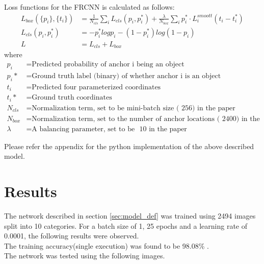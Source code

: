 \documentclass[12pt]{article}
\begin{document}
Loss functions for the FRCNN is calculated as follows:
\begin{align}
	L_{box}(\{p_i\},\{t_i\}) &= \frac{1}{N_{cls}}\sum_{i}{}L_{cls}(p_i, p_i^*) + \frac{\lambda}{N_{box}}\sum_{i}{}p_i^* \cdot L_i^{smoott}(t_i - t_i^*) \\	
	L_{cls}(p_i, p_i^*) &= -p_i^* logp_i - (1 - p_i^*)log(1 - p_i) \\
	L &= L_{cls} + L_{box}
\end{align} where 
\begin{align*}
	p_i &= \text{Predicted probability of anchor i being an object} \\
	p_i* &= \text{Ground truth label (binary) of whether anchor i is an object} \\
	t_i &= \text{Predicted four parameterized coordinates} \\
	t_i* &= \text{Ground truth coordinates} \\
	N_{cls} &= \text{Normalization term, set to be mini-batch size (~256) in the paper} \\
	N_{box} &= \text{Normalization term, set to the number of anchor locations (~2400) in the paper} \\
	\lambda &= \text{A balancing parameter, set to be ~10 in the paper } 
\end{align*}

Please refer the appendix for the python implementation of the above described model. 
\newpage

\section{Results}
The network described in section \ref{sec:model_def} was trained using 2494 images split into 10 categories. For a batch size of 1, 25 epochs and a learning rate of 0.0001, the following results were observed. \\

\noindent
The training accuracy(single execution) was found to be 98.08\% . \\

\noindent
The network was tested using the following images. \\
\end{document}
